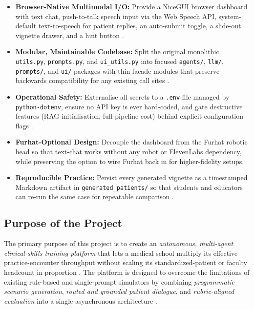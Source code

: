 \documentclass{article}
\begin{document}
\begin{itemize}
    \item \textbf{Browser-Native Multimodal I/O:} Provide a NiceGUI browser dashboard with text chat, push-to-talk speech input via the Web Speech API, system-default text-to-speech for patient replies, an auto-submit toggle, a slide-out vignette drawer, and a hint button \cite{Portovaras2024CurrentTA}.
    \item \textbf{Modular, Maintainable Codebase:} Split the original monolithic \texttt{utils.py}, \texttt{prompts.py}, and \texttt{ui\_utils.py} into focused \texttt{agents/}, \texttt{llm/}, \texttt{prompts/}, and \texttt{ui/} packages with thin facade modules that preserve backwards compatibility for any existing call sites \cite{Cheptsov2013IntroducingAN}.
    \item \textbf{Operational Safety:} Externalise all secrets to a \texttt{.env} file managed by \texttt{python-dotenv}, ensure no API key is ever hard-coded, and gate destructive features (RAG initialisation, full-pipeline cost) behind explicit configuration flags \cite{Shen2019ALA}.
    \item \textbf{Furhat-Optional Design:} Decouple the dashboard from the Furhat robotic head so that text-chat works without any robot or ElevenLabs dependency, while preserving the option to wire Furhat back in for higher-fidelity setups.
    \item \textbf{Reproducible Practice:} Persist every generated vignette as a timestamped Markdown artifact in \texttt{generated\_patients/} so that students and educators can re-run the same case for repeatable comparison \cite{Mahajan2022TextualDQ}.
\end{itemize}

\subsection{Purpose of the Project}

The primary purpose of this project is to create an \emph{autonomous, multi-agent clinical-skills training platform} that lets a medical school multiply its effective practice-encounter throughput without scaling its standardized-patient or faculty headcount in proportion \cite{Portovaras2024CurrentTA,Azzara2023PeranPP}. The platform is designed to overcome the limitations of existing rule-based and single-prompt simulators by combining \emph{programmatic scenario generation}, \emph{routed and grounded patient dialogue}, and \emph{rubric-aligned evaluation} into a single asynchronous architecture \cite{Topsakal2023CreatingLL,Kulkarni2023TheEO}.
\end{document}
